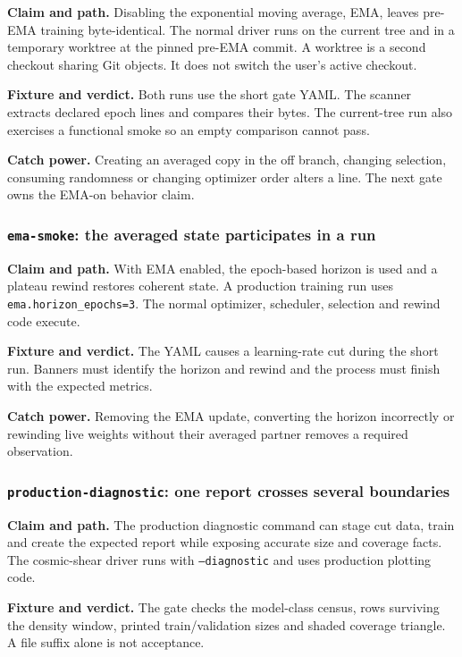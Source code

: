 \documentclass[10pt,aps,prd,twocolumn,nofootinbib]{revtex4-2}
\newcommand{\code}[1]{\texttt{#1}}
\begin{document}
\textbf{Claim and path.}  Disabling the exponential moving average, EMA,
leaves pre-EMA training byte-identical.  The normal driver runs on the current
tree and in a temporary worktree at the pinned pre-EMA commit.  A worktree is
a second checkout sharing Git objects.  It does not switch the user's active
checkout.

\textbf{Fixture and verdict.}  Both runs use the short gate YAML.  The scanner
extracts declared epoch lines and compares their bytes.  The current-tree run
also exercises a functional smoke so an empty comparison cannot pass.

\textbf{Catch power.}  Creating an averaged copy in the off branch, changing
selection, consuming randomness or changing optimizer order alters a line.
The next gate owns the EMA-on behavior claim.

\subsubsection{\code{ema-smoke}: the averaged state participates in a run}

\textbf{Claim and path.}  With EMA enabled, the epoch-based horizon is used
and a plateau rewind restores coherent state.  A production training run uses
\code{ema.horizon\_epochs=3}.  The normal optimizer, scheduler, selection
and rewind code execute.

\textbf{Fixture and verdict.}  The YAML causes a learning-rate cut during the
short run.  Banners must identify the horizon and rewind and the process must
finish with the expected metrics.

\textbf{Catch power.}  Removing the EMA update, converting the horizon
incorrectly or rewinding live weights without their averaged partner removes
a required observation.

\subsubsection{\code{production-diagnostic}: one report crosses several boundaries}

\textbf{Claim and path.}  The production diagnostic command can stage cut
data, train and create the expected report while exposing accurate size and
coverage facts.  The cosmic-shear driver runs with \code{--diagnostic} and
uses production plotting code.

\textbf{Fixture and verdict.}  The gate checks the model-class census, rows
surviving the density window, printed train/validation sizes and shaded
coverage triangle.  A file suffix alone is not acceptance.
\end{document}
